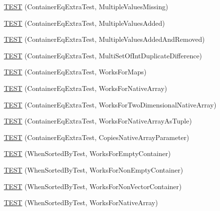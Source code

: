 \begin{DoxyCompactItemize}
\item 
\hyperlink{namespacetesting_1_1gmock__matchers__test_ab84ac6cfde20f21ed69d5d7aa882ea1b}{T\+E\+ST} (Container\+Eq\+Extra\+Test, Multiple\+Values\+Missing)
\item 
\hyperlink{namespacetesting_1_1gmock__matchers__test_acc28beb0f3d3fbd8923bad7eb08ce6a6}{T\+E\+ST} (Container\+Eq\+Extra\+Test, Multiple\+Values\+Added)
\item 
\hyperlink{namespacetesting_1_1gmock__matchers__test_acb0d845f828c2d5a551e4db0611f2853}{T\+E\+ST} (Container\+Eq\+Extra\+Test, Multiple\+Values\+Added\+And\+Removed)
\item 
\hyperlink{namespacetesting_1_1gmock__matchers__test_a6bce9564bb713ffb690b776e35d2e6cf}{T\+E\+ST} (Container\+Eq\+Extra\+Test, Multi\+Set\+Of\+Int\+Duplicate\+Difference)
\item 
\hyperlink{namespacetesting_1_1gmock__matchers__test_ab7bcbeeeb23094cff6f2882304c05134}{T\+E\+ST} (Container\+Eq\+Extra\+Test, Works\+For\+Maps)
\item 
\hyperlink{namespacetesting_1_1gmock__matchers__test_ae5e5420340c8cf91d24af11feca669b0}{T\+E\+ST} (Container\+Eq\+Extra\+Test, Works\+For\+Native\+Array)
\item 
\hyperlink{namespacetesting_1_1gmock__matchers__test_a3cf0d2f2c08e34ca0b7e11ff27b4a7ca}{T\+E\+ST} (Container\+Eq\+Extra\+Test, Works\+For\+Two\+Dimensional\+Native\+Array)
\item 
\hyperlink{namespacetesting_1_1gmock__matchers__test_a94e4a2a02cde84ac51e37cda1813bc77}{T\+E\+ST} (Container\+Eq\+Extra\+Test, Works\+For\+Native\+Array\+As\+Tuple)
\item 
\hyperlink{namespacetesting_1_1gmock__matchers__test_af7a978384d567d133240fb1899ec1658}{T\+E\+ST} (Container\+Eq\+Extra\+Test, Copies\+Native\+Array\+Parameter)
\item 
\hyperlink{namespacetesting_1_1gmock__matchers__test_a9d88fbc6e2d01b66a1c10b192b25a802}{T\+E\+ST} (When\+Sorted\+By\+Test, Works\+For\+Empty\+Container)
\item 
\hyperlink{namespacetesting_1_1gmock__matchers__test_a3095e5533ec12a67377dec6b0769d9a8}{T\+E\+ST} (When\+Sorted\+By\+Test, Works\+For\+Non\+Empty\+Container)
\item 
\hyperlink{namespacetesting_1_1gmock__matchers__test_a24d3caacabfef918b7a5b9dacc5e3a66}{T\+E\+ST} (When\+Sorted\+By\+Test, Works\+For\+Non\+Vector\+Container)
\item 
\hyperlink{namespacetesting_1_1gmock__matchers__test_a33b65fc6db83270b5c29073dbbf69c4e}{T\+E\+ST} (When\+Sorted\+By\+Test, Works\+For\+Native\+Array)

\end{DoxyCompactItemize}
